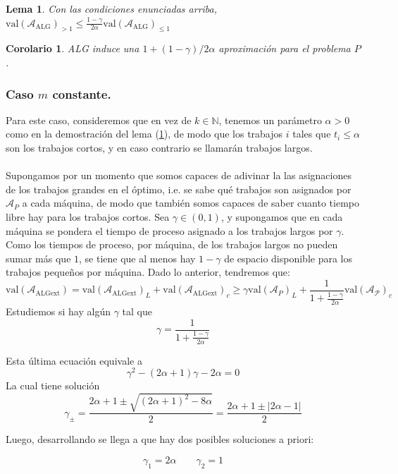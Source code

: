 \documentclass[10pt]{article}
\newcommand{\N}{\mathbb N}
\newcommand{\val}[1]{\text{val}(#1)}
\theoremstyle{plain}
\newtheorem{lem}{Lema}
\newtheorem{cor}{Corolario}
\theoremstyle{definition}
\begin{document}
\begin{lem}
\label{lem:capCalpha}
Con las condiciones enunciadas arriba, $\val{\mathcal{A}_{\text{ALG}}}_{>1} \leq \displaystyle \frac{1-\gamma}{2\alpha}\val{\mathcal{A}_{\text{ALG}}}_{\leq 1}$
\end{lem}

\begin{cor}
\label{cor:cAlpha}
ALG induce una $1+(1-\gamma)/2\alpha$ aproximación para el problema $P$.
\end{cor}
\newpage
\subsubsection*{Caso $m$ constante.}

Para este caso, consideremos que en vez de $k \in \N$, tenemos un parámetro $\alpha>0$ como en la demostración del lema (\ref{lem:capCalpha}), de modo que los trabajos $i$ tales que $t_i \leq \alpha$ son los trabajos cortos, y en caso contrario se llamarán trabajos largos.\\~\\

Supongamos por un momento que somos capaces de adivinar la las asignaciones de los trabajos grandes en el óptimo, i.e. se sabe qué trabajos son asignados por $\mathcal{A}_P$ a cada máquina, de modo que también somos capaces de saber cuanto tiempo libre hay para los trabajos cortos. Sea $\gamma \in (0,1)$, y supongamos que en cada máquina se pondera el tiempo de proceso asignado a los trabajos largos por $\gamma$. Como los tiempos de proceso, por máquina, de los trabajos largos no pueden sumar más que $1$, se tiene que al menos hay $1- \gamma$ de espacio disponible para los trabajos pequeños por máquina. Dado lo anterior, tendremos que:
$$
\val{\mathcal{A}_\text{ALGext}} = \val{\mathcal{A}_{\text{ALGext}}}_{L} + \val{\mathcal{A}_{\text{ALGext}}}_{c} \geq  \gamma \val{\mathcal{A}_P}_{L} + \frac{1}{1+ \frac{1-\gamma}{2 \alpha}}\val{\mathcal{A_P}}_{c}
$$
Estudiemos si hay algún $\gamma$ tal que
$$
\gamma  = \frac{1}{1+\frac{1-\gamma}{2\alpha}}
$$

Esta última ecuación equivale a
$$
\gamma^2-(2\alpha+1)\gamma -2\alpha = 0
$$
La cual tiene solución
$$
\gamma_\pm = \frac{2\alpha+1\pm\sqrt{(2\alpha+1)^2-8\alpha}}{2} = \frac{2\alpha+1\pm|2\alpha-1|}{2}
$$

Luego, desarrollando se llega a que hay dos posibles soluciones a priori:

$$
\gamma_1 = 2 \alpha \qquad \gamma_2 = 1
$$
\end{document}
